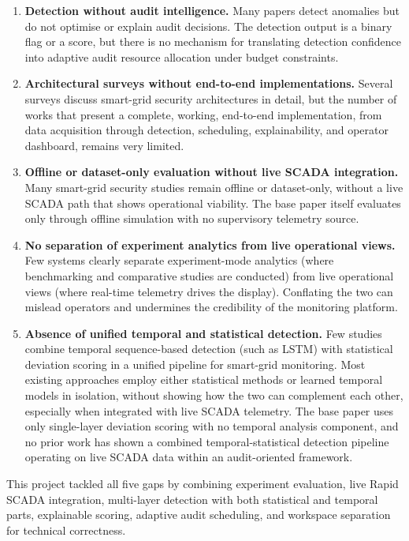 \begin{enumerate}
    \item \textbf{Detection without audit intelligence.} Many papers detect anomalies but do not optimise or explain audit decisions. The detection output is a binary flag or a score, but there is no mechanism for translating detection confidence into adaptive audit resource allocation under budget constraints.

    \item \textbf{Architectural surveys without end-to-end implementations.} Several surveys discuss smart-grid security architectures in detail, but the number of works that present a complete, working, end-to-end implementation, from data acquisition through detection, scheduling, explainability, and operator dashboard, remains very limited.

    \item \textbf{Offline or dataset-only evaluation without live SCADA integration.} Many smart-grid security studies remain offline or dataset-only, without a live SCADA path that shows operational viability. The base paper itself evaluates only through offline simulation with no supervisory telemetry source.

    \item \textbf{No separation of experiment analytics from live operational views.} Few systems clearly separate experiment-mode analytics (where benchmarking and comparative studies are conducted) from live operational views (where real-time telemetry drives the display). Conflating the two can mislead operators and undermines the credibility of the monitoring platform.

    \item \textbf{Absence of unified temporal and statistical detection.} Few studies combine temporal sequence-based detection (such as LSTM) with statistical deviation scoring in a unified pipeline for smart-grid monitoring. Most existing approaches employ either statistical methods or learned temporal models in isolation, without showing how the two can complement each other, especially when integrated with live SCADA telemetry. The base paper uses only single-layer deviation scoring with no temporal analysis component, and no prior work has shown a combined temporal-statistical detection pipeline operating on live SCADA data within an audit-oriented framework.
\end{enumerate}

This project tackled all five gaps by combining experiment evaluation, live Rapid SCADA integration, multi-layer detection with both statistical and temporal parts, explainable scoring, adaptive audit scheduling, and workspace separation for technical correctness.


